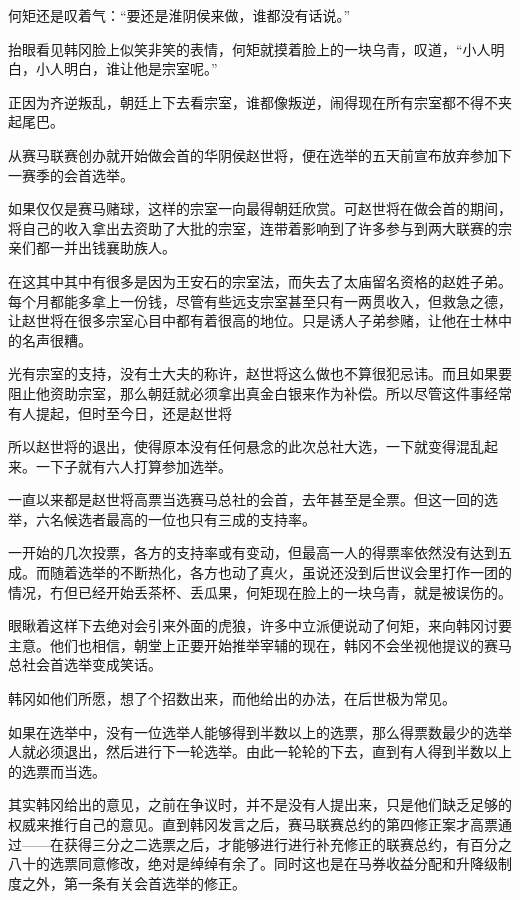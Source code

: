 何矩还是叹着气：“要还是淮阴侯来做，谁都没有话说。”

抬眼看见韩冈脸上似笑非笑的表情，何矩就摸着脸上的一块乌青，叹道，“小人明白，小人明白，谁让他是宗室呢。”

正因为齐逆叛乱，朝廷上下去看宗室，谁都像叛逆，闹得现在所有宗室都不得不夹起尾巴。

从赛马联赛创办就开始做会首的华阴侯赵世将，便在选举的五天前宣布放弃参加下一赛季的会首选举。

如果仅仅是赛马赌球，这样的宗室一向最得朝廷欣赏。可赵世将在做会首的期间，将自己的收入拿出去资助了大批的宗室，连带着影响到了许多参与到两大联赛的宗亲们都一并出钱襄助族人。

在这其中其中有很多是因为王安石的宗室法，而失去了太庙留名资格的赵姓子弟。每个月都能多拿上一份钱，尽管有些远支宗室甚至只有一两贯收入，但救急之德，让赵世将在很多宗室心目中都有着很高的地位。只是诱人子弟参赌，让他在士林中的名声很糟。

光有宗室的支持，没有士大夫的称许，赵世将这么做也不算很犯忌讳。而且如果要阻止他资助宗室，那么朝廷就必须拿出真金白银来作为补偿。所以尽管这件事经常有人提起，但时至今日，还是赵世将

所以赵世将的退出，使得原本没有任何悬念的此次总社大选，一下就变得混乱起来。一下子就有六人打算参加选举。

一直以来都是赵世将高票当选赛马总社的会首，去年甚至是全票。但这一回的选举，六名候选者最高的一位也只有三成的支持率。

一开始的几次投票，各方的支持率或有变动，但最高一人的得票率依然没有达到五成。而随着选举的不断热化，各方也动了真火，虽说还没到后世议会里打作一团的情况，冇但已经开始丢茶杯、丢瓜果，何矩现在脸上的一块乌青，就是被误伤的。

眼瞅着这样下去绝对会引来外面的虎狼，许多中立派便说动了何矩，来向韩冈讨要主意。他们也相信，朝堂上正要开始推举宰辅的现在，韩冈不会坐视他提议的赛马总社会首选举变成笑话。

韩冈如他们所愿，想了个招数出来，而他给出的办法，在后世极为常见。

如果在选举中，没有一位选举人能够得到半数以上的选票，那么得票数最少的选举人就必须退出，然后进行下一轮选举。由此一轮轮的下去，直到有人得到半数以上的选票而当选。

其实韩冈给出的意见，之前在争议时，并不是没有人提出来，只是他们缺乏足够的权威来推行自己的意见。直到韩冈发言之后，赛马联赛总约的第四修正案才高票通过——在获得三分之二选票之后，才能够进行进行补充修正的联赛总约，有百分之八十的选票同意修改，绝对是绰绰有余了。同时这也是在马券收益分配和升降级制度之外，第一条有关会首选举的修正。


